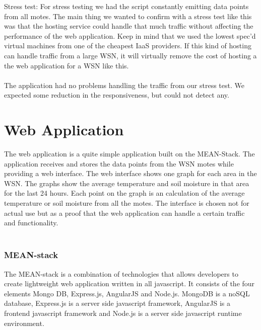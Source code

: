 \documentclass[]{uiophd}
\begin{document}
Stress test:  For stress testing we had the script constantly emitting data points from all motes. The main thing we wanted to confirm with a stress test like this was that the hosting service could handle that much traffic without affecting the performance of the web application. Keep in mind that we used the lowest spec’d virtual machines from one of the cheapest IaaS providers. If this kind of hosting can handle traffic from a large WSN, it will virtually remove the cost of hosting a the web application for a WSN like this. 
\\\\
The application had no problems handling the traffic from our stress test. We expected some reduction in the responsiveness, but could not detect any. 


\section{Web Application}
The web application is a quite simple application built on the MEAN-Stack. The application receives and stores the data points from the WSN motes while providing a web interface. The web interface shows one graph for each area in the WSN. The graphs show the average temperature and soil moisture in that area for the last 24 hours. Each point on the graph is an calculation of the average temperature or soil moisture from all the motes. The interface is chosen not for actual use but as a proof that the web application can handle a certain traffic and functionality. 
\\\\
\subsubsection{MEAN-stack}
The MEAN-stack is a combination of technologies that allows developers to create lightweight web application written in all javascript. It consists of the four elements Mongo DB, Express.js, AngularJS and Node.js. MongoDB is a noSQL database, Express.js is a server side javascript framework, AngularJS is a frontend javascript framework and Node.js is a server side javascript runtime environment. 
\\\\
\end{document}
